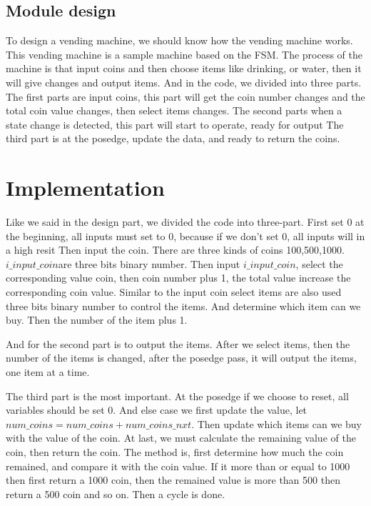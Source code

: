 \documentclass[12pt,a4paper]{article}
\begin{document}
\subsection{Module design}

To design a vending machine, we should know how the vending machine works.
This vending machine is a sample machine based on the FSM.
The process of the machine is that input coins and then choose items like drinking, or water, then it will give changes and output items.
And in the code, we divided into three parts. 
The first parts are input coins, this part will get the coin number changes and the total coin value changes, then select items changes.
The second parts when a state change is detected, this part will start to operate, ready for output
The third part is at the posedge, update the data, and ready to return the coins. 




\newpage

\section{Implementation}

Like we said in the design part, we divided the code into three-part.
First set 0 at the beginning, all inputs must set to 0, because if we don't set 0, all inputs will in a high resit
Then input the coin. There are three kinds of coins 100,500,1000.
$i\_input\_coin $are three bits binary number. 
Then input $i\_input\_coin$, select the corresponding value coin, then coin number plus 1, the total value increase the corresponding coin value.
Similar to the input coin select items are also used three bits binary number to control the items. 
And determine which item can we buy.
Then the number of the item plus 1.

And for the second part is to output the items. 
After we select items, then the number of the items is changed, after the posedge pass, it will output the items, one item at a time.

The third part is the most important.
At the posedge if we choose to reset, all variables should be set 0.
And else case we first update the value, let $num\_coins =num\_coins + num\_coins\_nxt$.
Then update which items can we buy with the value of the coin.
At last, we must calculate the remaining value of the coin, then return the coin.
The method is, first determine how much the coin remained, and compare it with the coin value.
If it more than or equal to 1000 then first return a 1000 coin, then the remained value is more than 500 then return a 500 coin and so on.
Then a cycle is done.  
\end{document}
